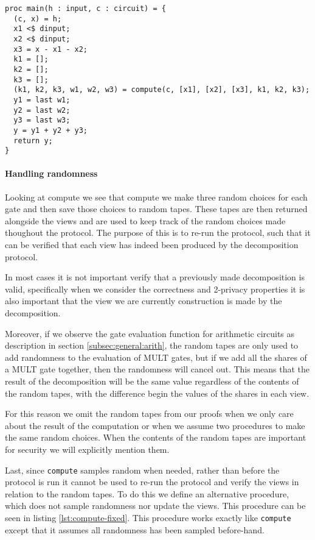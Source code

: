 \begin{lstlisting}[float,label=lst:zkboo:decompose,caption=Decompose procedure]
proc main(h : input, c : circuit) = {
  (c, x) = h;
  x1 <$ dinput;
  x2 <$ dinput;
  x3 = x - x1 - x2;
  k1 = [];
  k2 = [];
  k3 = [];
  (k1, k2, k3, w1, w2, w3) = compute(c, [x1], [x2], [x3], k1, k2, k3);
  y1 = last w1;
  y2 = last w2;
  y3 = last w3;
  y = y1 + y2 + y3;
  return y;
}
\end{lstlisting}

\paragraph{Handling randomness}
\label{subsec:decomp:randomness}

Looking at compute we see that compute we make three random choices for each
gate and then save those choices to random tapes. These tapes are then
returned alongside the views and are used to keep track of the random choices made thoughout the
protocol.
The purpose of this is to re-run the protocol, such that it can be verified that
each view has indeed been produced by the decomposition protocol.

In most cases it is not important verify that a previously made decomposition is
valid, specifically when we consider the correctness and 2-privacy properties it
is also important that the view we are currently construction is made by the decomposition.

Moreover, if we observe the gate evaluation function for arithmetic circuits as
description in section \ref{subsec:general:arith}, the random tapes are only used
to add randomness to the evaluation of MULT gates, but if we add all the shares
of a MULT gate together, then the randomness will cancel out. This means that
the result of the decomposition will be the same value regardless of the
contents of the random tapes, with the difference begin the values of the
shares in each view.

For this reason we omit the random tapes from our proofs when we only care about
the result of the computation or when we assume two procedures to make the same
random choices. When the contents of the random tapes are important for security
we will explicitly mention them.

Last, since \texttt{compute} samples random when needed, rather than before the
protocol is run it cannot be used to re-run the protocol and verify the views in
relation to the random tapes. To do this we define an alternative procedure,
which does not sample randomness nor update the views. This procedure can be
seen in listing \ref{lst:compute-fixed}. This procedure works exactly like
\texttt{compute} except that it assumes all randomness has been sampled
before-hand.

